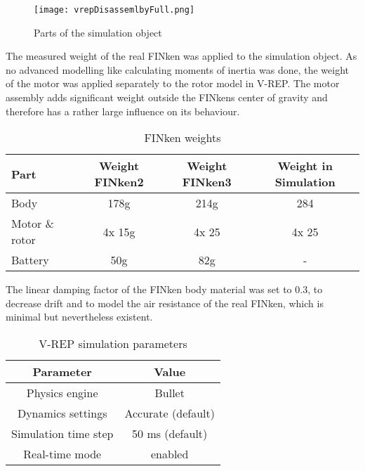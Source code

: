 \begin{figure}[h!]
 \begin{center}
  \texttt{[image: vrepDisassemlbyFull.png]}
 \end{center}
  \caption{Parts of the simulation object \label{fig:vrepParts}}
\end{figure}

The measured weight of the real FINken was applied to the simulation object. 
As no advanced modelling like calculating moments of inertia was done, the weight of the motor was applied separately to the rotor model in V-REP.  The motor assembly adds significant weight outside the FINkens center of gravity and therefore has a rather large influence on its behaviour. 

\begin{table}[h]
	\centering
	\begin{tabular}{|l|c|c|c|}
    		\hline
		Part & Weight FINken2 & Weight FINken3 & Weight in Simulation \\
		\hline
    		Body & 178g &  214g & 284\\
    		\hline
		Motor \& rotor & 4x 15g & 4x 25 & 4x 25\\
    		\hline
		Battery & 50g & 82g & - \\
    		\hline
	\end{tabular}
    	\caption{FINken weights}
      	\label{tab:finkWeight}
\end{table}

The linear damping factor of the FINken body material was set to 0.3, to decrease drift and to model the air resistance of the real FINken, which is minimal but nevertheless existent.

\begin{table}[h]
	\centering
	\begin{tabular}{|c|c|}
    		\hline
		Parameter & Value \\
		\hline
    		Physics engine & Bullet\\
    		\hline
    		Dynamics settings & Accurate (default) \\
    		\hline
    		Simulation time step & 50 ms (default) \\
    		\hline
    		Real-time mode & enabled \\
    		\hline
	\end{tabular}
    	\caption{V-REP simulation parameters}
      	\label{tab:simSettings}
\end{table}

